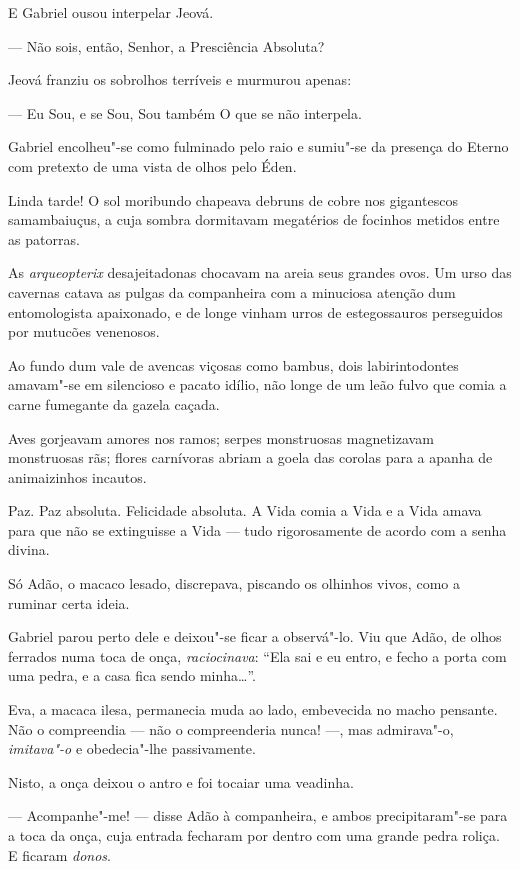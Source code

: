 E Gabriel ousou interpelar Jeová.

--- Não sois, então, Senhor, a Presciência Absoluta?

Jeová franziu os sobrolhos terríveis e murmurou apenas:

--- Eu Sou, e se Sou, Sou também O que se não interpela.

Gabriel encolheu"-se como fulminado pelo raio e sumiu"-se da presença do
Eterno com pretexto de uma vista de olhos pelo Éden.

Linda tarde! O sol moribundo chapeava debruns de cobre nos gigantescos
samambaiuçus, a cuja sombra dormitavam megatérios de focinhos metidos
entre as patorras.

As \emph{arqueopterix} desajeitadonas chocavam na areia seus grandes
ovos. Um urso das cavernas catava as pulgas da companheira com a
minuciosa atenção dum entomologista apaixonado, e de longe vinham urros
de estegossauros perseguidos por mutucões venenosos.

Ao fundo dum vale de avencas viçosas como bambus, dois labirintodontes
amavam"-se em silencioso e pacato idílio, não longe de um leão fulvo que
comia a carne fumegante da gazela caçada.

Aves gorjeavam amores nos ramos; serpes monstruosas magnetizavam
monstruosas rãs; flores carnívoras abriam a goela das corolas para a
apanha de animaizinhos incautos.

Paz. Paz absoluta. Felicidade absoluta. A Vida comia a Vida e a Vida
amava para que não se extinguisse a Vida --- tudo rigorosamente de
acordo com a senha divina.

Só Adão, o macaco lesado, discrepava, piscando os olhinhos vivos, como a
ruminar certa ideia.

Gabriel parou perto dele e deixou"-se ficar a observá"-lo. Viu que Adão,
de olhos ferrados numa toca de onça, \emph{raciocinava}: ``Ela sai e eu
entro, e fecho a porta com uma pedra, e a casa fica sendo minha\ldots{}''.

Eva, a macaca ilesa, permanecia muda ao lado, embevecida no macho
pensante. Não o compreendia --- não o compreenderia nunca! ---, mas
admirava"-o, \emph{imitava"-o} e obedecia"-lhe passivamente.

Nisto, a onça deixou o antro e foi tocaiar uma veadinha.

--- Acompanhe"-me! --- disse Adão à companheira, e ambos precipitaram"-se
para a toca da onça, cuja entrada fecharam por dentro com uma grande
pedra roliça. E ficaram \emph{donos}.

